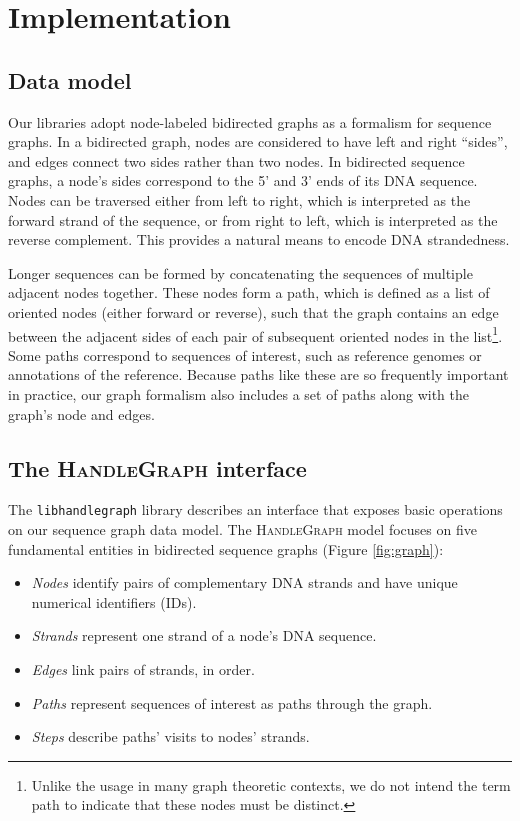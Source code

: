 \documentclass[11pt]{ucthesis}
\begin{document}
\section{Implementation}

\subsection{Data model}

Our libraries adopt node-labeled bidirected graphs as a formalism for sequence graphs.
In a bidirected graph, nodes are considered to have left and right ``sides'', and edges connect two sides rather than two nodes.
In bidirected sequence graphs, a node's sides correspond to the 5' and 3' ends of its DNA sequence. 
Nodes can be traversed either from left to right, which is interpreted as the forward strand of the sequence, or from right to left, which is interpreted as the reverse complement.
This provides a natural means to encode DNA strandedness.

Longer sequences can be formed by concatenating the sequences of multiple adjacent nodes together.
These nodes form a path, which is defined as a list of oriented nodes (either forward or reverse), such that the graph contains an edge between the adjacent sides of each pair of subsequent oriented nodes in the list\footnote{Unlike the usage in many graph theoretic contexts, we do not intend the term path to indicate that these nodes must be distinct.}.
Some paths correspond to sequences of interest, such as reference genomes or annotations of the reference.
Because paths like these are so frequently important in practice, our graph formalism also includes a set of paths along with the graph's node and edges.

\subsection{The \textsc{HandleGraph} interface}

The \texttt{libhandlegraph} library describes an interface that exposes basic operations on our sequence graph data model.
The \textsc{HandleGraph} model focuses on five fundamental entities in bidirected sequence graphs (Figure \ref{fig:graph}):

\begin{itemize}
\item \emph{Nodes} identify pairs of complementary DNA strands and have unique numerical identifiers (IDs).
\item \emph{Strands} represent one strand of a node's DNA sequence.
\item \emph{Edges} link pairs of strands, in order.
\item \emph{Paths} represent sequences of interest as paths through the graph.
\item \emph{Steps} describe paths' visits to nodes' strands.
\end{itemize}
\end{document}

